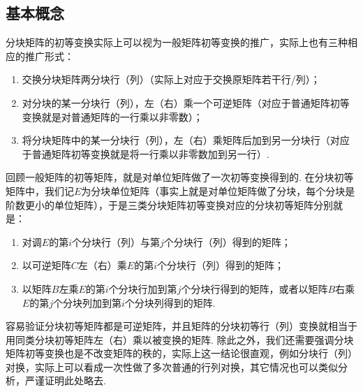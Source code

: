 \subsection{基本概念}
分块矩阵的初等变换实际上可以视为一般矩阵初等变换的推广，实际上也有三种相应的推广形式：
\begin{enumerate}
    \item 交换分块矩阵两分块行（列）（实际上对应于交换原矩阵若干行/列）；

    \item 对分块的某一分块行（列），左（右）乘一个可逆矩阵（对应于普通矩阵初等变换就是对普通矩阵的一行乘以非零数）；

    \item 将分块矩阵中的某一分块行（列），左（右）乘矩阵后加到另一分块行（对应于普通矩阵初等变换就是将一行乘以非零数加到另一行）.
\end{enumerate}

回顾一般矩阵的初等矩阵，就是对单位矩阵做了一次初等变换得到的. 在分块初等矩阵中，我们记$E$为分块单位矩阵（事实上就是对单位矩阵做了分块，每个分块是阶数更小的单位矩阵），于是三类分块矩阵初等变换对应的分块初等矩阵分别就是：
\begin{enumerate}
    \item 对调$E$的第$i$个分块行（列）与第$j$个分块行（列）得到的矩阵；
    \item 以可逆矩阵$C$左（右）乘$E$的第$i$个分块行（列）得到的矩阵；
    \item 以矩阵$B$左乘$E$的第$i$个分块行加到第$j$个分块行得到的矩阵，或者以矩阵$B$右乘$E$的第$j$个分块列加到第$i$个分块列得到的矩阵.
\end{enumerate}

容易验证分块初等矩阵都是可逆矩阵，并且矩阵的分块初等行（列）变换就相当于用同类分块初等矩阵左（右）乘以被变换的矩阵. 除此之外，我们还需要强调分块矩阵初等变换也是不改变矩阵的秩的，实际上这一结论很直观，例如分块行（列）对换，实际上可以看成一次性做了多次普通的行列对换，其它情况也可以类似分析，严谨证明此处略去.

